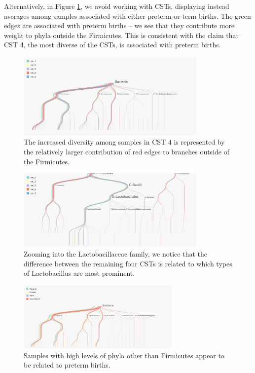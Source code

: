 \documentclass[12pt]{article}
\begin{document}
Alternatively, in Figure \ref{fig:pretermcsts}, we avoid working with
CSTs, displaying instead averages among samples associated with either
preterm or term births. The green edges are associated with preterm
births -- we see that they contribute more weight to phyla outside the
Firmicutes. This is consistent with the claim that CST 4, the most
diverse of the CSTs, is associated with preterm births.

\begin{figure}

{\centering \includegraphics[width=350px]{figure/preterm_csts} 

}

\caption{The increased diversity among samples in CST 4 is represented by the relatively larger contribution of red edges to branches outside of the Firmicutes.}\label{fig:pretermcsts}
\end{figure}

\begin{figure}

{\centering \includegraphics[width=350px]{figure/preterm_csts_lacto} 

}

\caption{Zooming into the Lactobacillaceae family, we notice that the difference between the remaining four CSTs is related to which types of Lactobacillus are most prominent.}\label{fig:pretermcstslacto}
\end{figure}

\begin{figure}

{\centering \includegraphics[width=300px]{figure/preterm_preterm} 

}

\caption{Samples with high levels of phyla other than Firmicutes appear to be related to preterm births.}\label{fig:pretermpreterm}
\end{figure}
\end{document}
